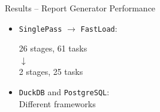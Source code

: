 \documentclass[aspectratio=169, handout]{beamer}
\begin{document}
\begin{frame}{Results -- Report Generator Performance}
\begin{minipage}{0.35\textwidth}
\begin{itemize}
                  \small 83\% reduction in disk reads
            \vspace{\baselineskip}
            \normalsize
            \item \texttt{SinglePass} $\rightarrow$ \texttt{FastLoad}: \\
            \begin{center}
                \small
                \vspace{\baselineskip}
                26 stages, 61 tasks \\
                $\downarrow$ \\
                2 stages, 25 tasks
                \vspace{\baselineskip}
            \end{center}
            \item \texttt{DuckDB} and \texttt{PostgreSQL}: \\
                  \small Different frameworks
        \end{itemize}
    \end{minipage}
\end{frame}
\end{document}
